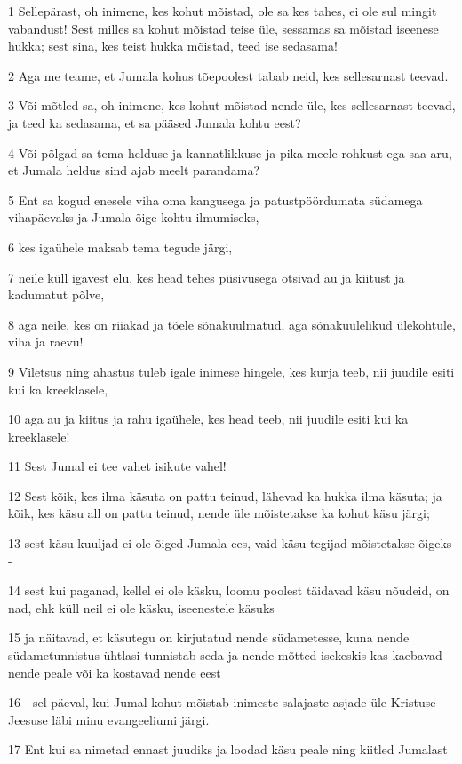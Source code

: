 \par 1 Sellepärast, oh inimene, kes kohut mõistad, ole sa kes tahes, ei ole sul mingit vabandust! Sest milles sa kohut mõistad teise üle, sessamas sa mõistad iseenese hukka; sest sina, kes teist hukka mõistad, teed ise sedasama!
\par 2 Aga me teame, et Jumala kohus tõepoolest tabab neid, kes sellesarnast teevad.
\par 3 Või mõtled sa, oh inimene, kes kohut mõistad nende üle, kes sellesarnast teevad, ja teed ka sedasama, et sa pääsed Jumala kohtu eest?
\par 4 Või põlgad sa tema helduse ja kannatlikkuse ja pika meele rohkust ega saa aru, et Jumala heldus sind ajab meelt parandama?
\par 5 Ent sa kogud enesele viha oma kangusega ja patustpöördumata südamega vihapäevaks ja Jumala õige kohtu ilmumiseks,
\par 6 kes igaühele maksab tema tegude järgi,
\par 7 neile küll igavest elu, kes head tehes püsivusega otsivad au ja kiitust ja kadumatut põlve,
\par 8 aga neile, kes on riiakad ja tõele sõnakuulmatud, aga sõnakuulelikud ülekohtule, viha ja raevu!
\par 9 Viletsus ning ahastus tuleb igale inimese hingele, kes kurja teeb, nii juudile esiti kui ka kreeklasele,
\par 10 aga au ja kiitus ja rahu igaühele, kes head teeb, nii juudile esiti kui ka kreeklasele!
\par 11 Sest Jumal ei tee vahet isikute vahel!
\par 12 Sest kõik, kes ilma käsuta on pattu teinud, lähevad ka hukka ilma käsuta; ja kõik, kes käsu all on pattu teinud, nende üle mõistetakse ka kohut käsu järgi;
\par 13 sest käsu kuuljad ei ole õiged Jumala ees, vaid käsu tegijad mõistetakse õigeks -
\par 14 sest kui paganad, kellel ei ole käsku, loomu poolest täidavad käsu nõudeid, on nad, ehk küll neil ei ole käsku, iseenestele käsuks
\par 15 ja näitavad, et käsutegu on kirjutatud nende südametesse, kuna nende südametunnistus ühtlasi tunnistab seda ja nende mõtted isekeskis kas kaebavad nende peale või ka kostavad nende eest
\par 16 - sel päeval, kui Jumal kohut mõistab inimeste salajaste asjade üle Kristuse Jeesuse läbi minu evangeeliumi järgi.
\par 17 Ent kui sa nimetad ennast juudiks ja loodad käsu peale ning kiitled Jumalast
